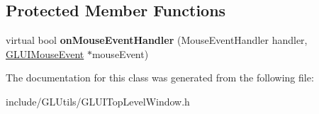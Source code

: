 \subsection*{Protected Member Functions}
\begin{DoxyCompactItemize}
\item 
\hypertarget{classCartWheel_1_1GL_1_1GLUITopLevelWindow_abfacfb090850edcdc4d6e8bdd9b763a5}{
virtual bool {\bfseries onMouseEventHandler} (MouseEventHandler handler, \hyperlink{classCartWheel_1_1GL_1_1GLUIMouseEvent}{GLUIMouseEvent} $\ast$mouseEvent)}
\label{classCartWheel_1_1GL_1_1GLUITopLevelWindow_abfacfb090850edcdc4d6e8bdd9b763a5}

\end{DoxyCompactItemize}


The documentation for this class was generated from the following file:\begin{DoxyCompactItemize}
\item 
include/GLUtils/GLUITopLevelWindow.h\end{DoxyCompactItemize}
